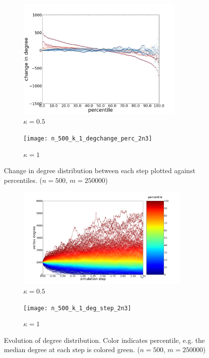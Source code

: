 \documentclass[11pt]{article}
\begin{document}
\begin{changemargin}{0.0cm}{0.0cm}
\begin{figure}[h!]
  \vspace{-5mm}
  \centering
  \begin{subfigure}{0.5\textwidth}
    \centering
    \includegraphics[height=60mm]{n_500_2n3_degchange_percentile}
    \caption{$\kappa=0.5$}
    \label{fig:100s3}
  \end{subfigure}%
  \begin{subfigure}{0.5\textwidth}
    \centering
    \texttt{[image: n\_500\_k\_1\_degchange\_perc\_2n3]}
    \caption{$\kappa=1$}
    \label{fig:100s3}
  \end{subfigure}%
  \caption{Change in degree distribution between each step plotted against percentiles. ($n=500$, $m=250000$)}
\end{figure}

\begin{figure}[h!]
  \vspace{-5mm}
  \begin{subfigure}{0.5\textwidth}
    \includegraphics[height=50mm]{n_500_2n3_deg_step}
    \caption{$\kappa=0.5$}
    \label{fig:100s3}
  \end{subfigure}%
  \begin{subfigure}{0.5\textwidth}
    \texttt{[image: n\_500\_k\_1\_deg\_step\_2n3]}
    \caption{$\kappa=1$}
    \label{fig:100s3}
  \end{subfigure}%
  \caption{Evolution of degree distribution. Color indicates percentile, e.g. the median degree at each step is colored green. ($n=500$, $m=250000$)}
\end{figure}
\end{changemargin}
\end{document}
